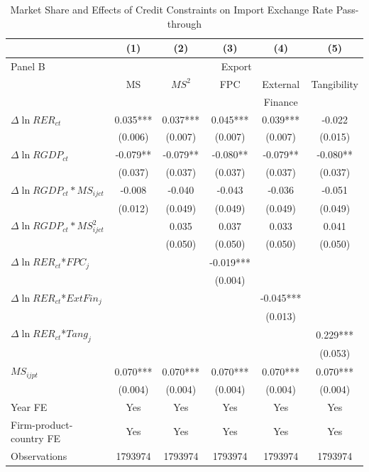 \documentclass[12pt]{article}
\begin{document}
\begin{table}[htbp]
	\centering
	\caption{Market Share and Effects of Credit Constraints on Import Exchange Rate Pass-through}
	\begin{threeparttable}
	\begin{tabular}{lccccc}
		\toprule
		& (1)   & (2)   & (3)   & (4) & (5)\\
		\midrule
		Panel B & \multicolumn{5}{c}{Export} \\
		& MS    & $MS^2$ &FPC& External & Tangibility \\
		&       &       && Finance &  \\
		\midrule
		$\Delta \ln RER_{ct}$ & 0.035*** & 0.037*** & 0.045*** & 0.039*** & -0.022 \\
		& (0.006) & (0.007) & (0.007) & (0.007) & (0.015) \\
		$\Delta \ln RGDP_{ct}$ & -0.079** & -0.079** & -0.080** & -0.079** & -0.080** \\
		& (0.037) & (0.037) & (0.037) & (0.037) & (0.037) \\
		$\Delta \ln RGDP_{ct}*MS_{ijct}$ & -0.008 & -0.040 & -0.043 & -0.036 & -0.051 \\
		& (0.012) & (0.049) & (0.049) & (0.049) & (0.049) \\
		$\Delta \ln RGDP_{ct}*MS^2_{ijct}$ &       & 0.035 & 0.037 & 0.033 & 0.041 \\
		&       & (0.050) & (0.050) & (0.050) & (0.050) \\
		$\Delta \ln RER_{ct}$*$FPC_{j}$ &       &       & -0.019*** &       &  \\
		&       &       & (0.004) &       &  \\
		$\Delta \ln RER_{ct}$*$ExtFin_{j}$ &       &       &       & -0.045*** &  \\
		&       &       &       & (0.013) &  \\
		$\Delta \ln RER_{ct}$*$Tang_{j}$ &       &       &       &       & 0.229*** \\
		&       &       &       &       & (0.053) \\
		$MS_{ijpt}$    & 0.070*** & 0.070*** & 0.070*** & 0.070*** & 0.070*** \\
		& (0.004) & (0.004) & (0.004) & (0.004) & (0.004) \\
		Year FE  & Yes   & Yes   &   Yes    & Yes   & Yes \\
		Firm-product-country FE & Yes   & Yes   &   Yes    & Yes   & Yes \\
		Observations & 1793974 & 1793974 & 1793974 & 1793974 & 1793974 \\

\end{tabular}
\end{threeparttable}
\end{table}
\end{document}
